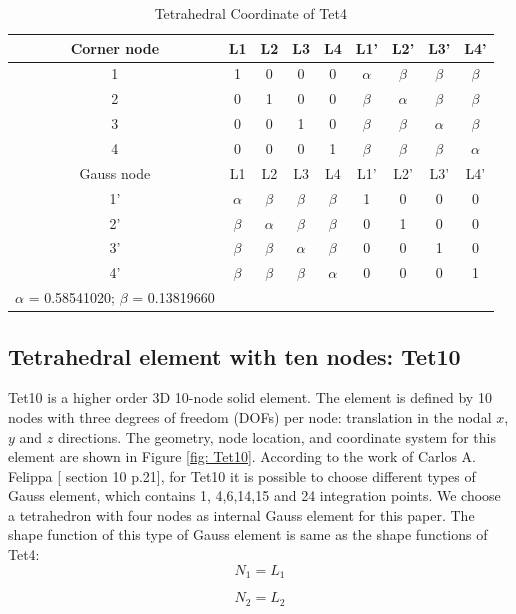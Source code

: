 \begin{table}
	\centering
	\caption{Tetrahedral Coordinate of Tet4} \label{tab: Tet4}
	\begin{tabular}{ccccccccc}			
		\hline
		Corner node\centering& L1& L2& L3& L4& L1'& L2'& L3'& L4'\\ \hline
		1\centering& 1& 0& 0& 0& $\alpha$& $\beta$& $\beta$& $\beta$\\
		2\centering& 0& 1& 0& 0& $\beta$& $\alpha$& $\beta$& $\beta$\\
		3\centering& 0& 0& 1& 0& $\beta$& $\beta$& $\alpha$& $\beta$\\
		4\centering& 0& 0& 0& 1& $\beta$& $\beta$& $\beta$& $\alpha$\\
		\hline
		Gauss node\centering& L1& L2& L3& L4& L1'& L2'& L3'& L4' \\ \hline
		1'\centering& $\alpha$& $\beta$& $\beta$& $\beta$& 1& 0& 0& 0  \\
		2'\centering&$\beta$ & $\alpha$& $\beta$& $\beta$& 0& 1& 0& 0 \\
		3'\centering& $\beta$& $\beta$& $\alpha$& $\beta$& 0& 0& 1& 0\\
		4'\centering& $\beta$& $\beta$& $\beta$& $\alpha$& 0& 0& 0& 1\\
		\hline
		$\alpha$ = 0.58541020; $\beta$ = 0.13819660&&&&&&&&\\
		\hline 		    
	\end{tabular}	
\end{table}		

\subsection{Tetrahedral element with ten nodes: Tet10}
Tet10 is a higher order 3D 10-node solid element. The element is defined by 10 nodes with three degrees of freedom (DOFs) per node: translation in the nodal $x$, $y$ and $z$ directions. The geometry, node location, and coordinate system for this element are shown in Figure \ref{fig: Tet10}. According to the work of Carlos A. Felippa [\cite{Felippa} section 10 p.21], for Tet10 it is possible to choose different types of Gauss element, which contains 1, 4,6,14,15 and 24 integration points. We choose a tetrahedron with four nodes as internal Gauss element for this paper. The shape function of this type of Gauss element is same as the shape functions of Tet4:
\begin{equation}
N_1 = L_1
\end{equation}

\begin{equation}
N_2 = L_2
\end{equation}

